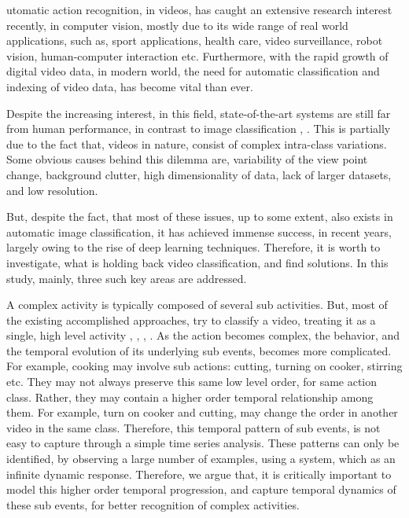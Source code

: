  utomatic action recognition, in videos, has caught an extensive research interest recently, 
in computer vision, mostly due to its wide range of real world applications, such as, 
sport applications, health care, video surveillance, robot vision, human-computer interaction
etc. Furthermore, with the rapid growth of digital video data, in modern world, 
the need for automatic
classification and indexing of video data, has become vital than ever. 

Despite the increasing interest, in this field, state-of-the-art
systems are still far from human performance, in contrast to image classification \cite{girshick2014rich},
 \cite{krizhevsky2012imagenet}. This is
partially due to the fact that, videos in nature, consist of complex intra-class variations. Some
obvious causes behind this dilemma are, variability of the view point change, background 
clutter, high dimensionality of data, lack of larger datasets, and low resolution. 

But, despite the fact, that most of these issues, up to some extent, also exists in 
automatic image classification, it has achieved immense success, in recent years,
largely owing to the rise of deep learning techniques. Therefore, it is worth to investigate,
what is holding back video classification, and find solutions. In this study, mainly, three such key
areas are addressed.

A complex activity is typically composed of several sub activities. 
But, most of the existing accomplished approaches, try to classify a video, treating it as a 
single, high level activity \cite{wang2011action}, \cite{wang2013action}, \cite{simonyan2014two}, 
\cite{7486474}.
As the action becomes complex, the behavior, and the 
temporal evolution of its underlying sub events, becomes more complicated. For example,
cooking may involve sub actions: cutting, turning on cooker, stirring etc. They may not always preserve this 
same low level order, for same action class. Rather, they may contain 
a higher order temporal relationship among them. For example, turn on cooker and cutting,
may change the order in another video in the same class. 
Therefore, this temporal pattern of sub events, is not easy to capture through a simple
time series analysis. These patterns can only be identified, by observing a large number
of examples, using a system, which as an infinite dynamic response. Therefore, we argue that, it is critically important to
model this higher order temporal
progression, and capture temporal dynamics of these sub events, for better recognition of
complex activities. 

